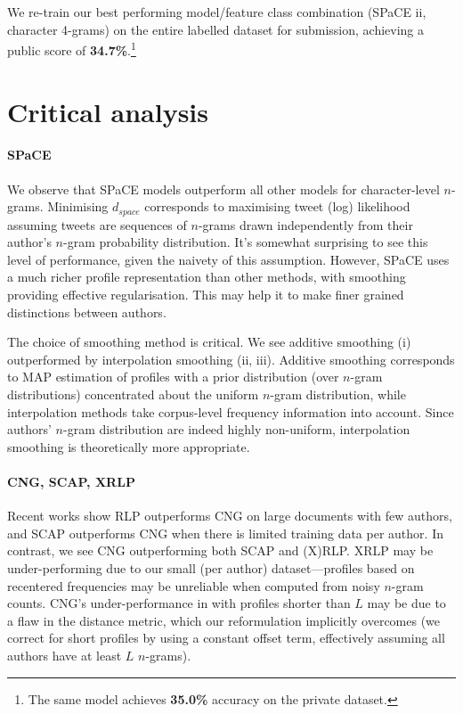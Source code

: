 \documentclass[twocolumn,10pt]{article}
\begin{document}
We re-train our best performing model/feature class combination
(SPaCE ii, character 4-grams) on the entire labelled dataset for
submission,
achieving a public score of \textbf{34.7\%}.\footnote{The same 
model achieves \textbf{35.0\%} accuracy on the private dataset.}

\section{Critical analysis}


\paragraph{SPaCE}
We observe that SPaCE models outperform all other models for
character-level $n$-grams.
Minimising $d_{space}$ corresponds to maximising
tweet (log) likelihood assuming tweets are sequences of
$n$-grams drawn independently from their author's $n$-gram
probability distribution.
It's somewhat surprising to see this level of performance,
given the naivety of this assumption.
However, SPaCE uses a much richer profile representation
than other methods, with smoothing providing effective
regularisation. This may help it to make finer grained
distinctions between authors.

The choice of smoothing method is critical.
We see additive smoothing (i) outperformed by interpolation
smoothing (ii, iii).
Additive smoothing corresponds to
MAP estimation of profiles with a prior distribution 
(over $n$-gram distributions) concentrated about the uniform
$n$-gram distribution,
while interpolation methods take corpus-level frequency
information into account.
Since authors' $n$-gram distribution are indeed highly
non-uniform, interpolation smoothing is theoretically
more appropriate.


\paragraph{CNG, SCAP, XRLP} Recent works show RLP outperforms CNG
on large documents with few authors\supercite{layton2012recentred},
and SCAP outperforms CNG when there is limited training data per
author\supercite{frantzeskou2006effective}.
In contrast, we see CNG outperforming both SCAP and (X)RLP.
XRLP may be under-performing due to our small (per author)
dataset---profiles based on recentered frequencies may be unreliable
when computed from noisy $n$-gram counts.
CNG's under-performance in \cite{frantzeskou2006effective} with
profiles shorter than $L$ may be due to a flaw in the distance
metric, which our reformulation implicitly overcomes (we correct
for short profiles by using a constant offset term, effectively
assuming all authors have at least $L$ $n$-grams).
\end{document}
